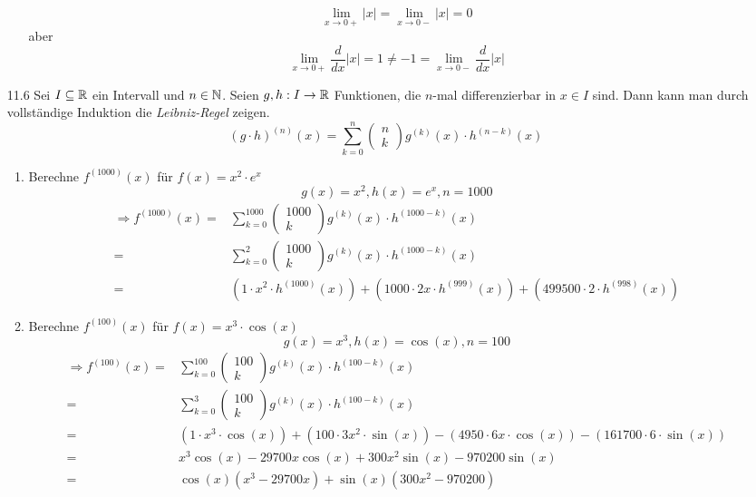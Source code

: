 \documentclass{HM}
\begin{document}
\begin{enumerate}
\begin{enumerate}
	$$\lim\limits_{x\to 0+}|x|=\lim\limits_{x\to 0-}|x|=0$$
	aber $$\lim\limits_{x\to 0+}\frac{d}{dx}|x|=1\not=-1=\lim\limits_{x\to 0-}\frac{d}{dx}|x|$$
\end{enumerate}
\newpage
\item [11.6] Sei $I\subseteq\mathbb{R}$ ein Intervall und $n\in\mathbb{N}$. Seien $g,h:I\to\mathbb{R}$ Funktionen, die $n$-mal differenzierbar in $x\in I$ sind. Dann kann man durch vollständige Induktion die \textit{Leibniz-Regel} zeigen.
$$(g\cdot h)^{(n)}(x)=\sum\limits_{k=0}^n\begin{pmatrix}
n\\k
\end{pmatrix}g^{(k)}(x)\cdot h^{(n-k)}(x)$$
\begin{enumerate}
	\item Berechne $f^{(1000)}(x)$ für $f(x)=x^2\cdot e^x$\\
	$$g(x)=x^2, h(x)=e^x, n=1000$$
	\begin{align*}
	\Rightarrow f^{(1000)}(x)=&\sum\limits_{k=0}^{1000}\begin{pmatrix}
1000\\k
\end{pmatrix} g^{(k)}(x)\cdot h^{(1000-k)}(x)\\
=&\sum\limits_{k=0}^{2}\begin{pmatrix}
1000\\k
\end{pmatrix}g^{(k)}(x)\cdot h^{(1000-k)}(x)\\
=&(1\cdot x^2\cdot h^{(1000)}(x))+(1000\cdot 2x\cdot h^{(999)}(x))+
(499500\cdot 2\cdot h^{(998)}(x))
	\end{align*}
	\item Berechne $f^{(100)}(x)$ für $f(x)=x^3\cdot \cos(x)$\\
	$$g(x)=x^3, h(x)=\cos(x), n=100$$
	\begin{align*}
	\Rightarrow f^{(100)}(x)=&\sum\limits_{k=0}^{100}\begin{pmatrix}
100\\k
\end{pmatrix} g^{(k)}(x)\cdot h^{(100-k)}(x)\\
=&\sum\limits_{k=0}^{3}\begin{pmatrix}
100\\k
\end{pmatrix}g^{(k)}(x)\cdot h^{(100-k)}(x)\\
=&(1\cdot x^3\cdot \cos(x))+(100\cdot 3x^2\cdot \sin(x))-(4950\cdot 6x\cdot \cos(x))-(161700\cdot 6\cdot \sin(x))\\
=&x^3\cos(x)-29700x\cos(x)+300x^2\sin(x)-970200\sin(x)\\
=&\cos(x)(x^3-29700x)+\sin(x)(300x^2-970200)
	\end{align*}
\end{enumerate}
\end{enumerate}
\end{document}
